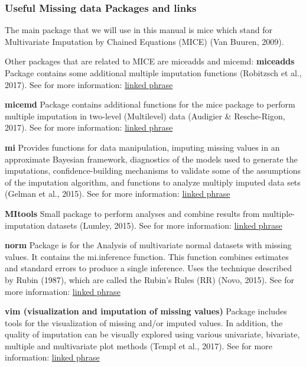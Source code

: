 \documentclass[]{book}
\theoremstyle{definition}
\theoremstyle{definition}
\theoremstyle{definition}
\theoremstyle{remark}
\begin{document}
\subsubsection{Useful Missing data Packages and
links}\label{useful-missing-data-packages-and-links}

The main package that we will use in this manual is mice which stand for
Multivariate Imputation by Chained Equations (MICE) (Van Buuren, 2009).

Other packages that are related to MICE are miceadds and micemd:
\textbf{miceadds} Package contains some additional multiple imputation
functions (Robitzsch et al., 2017). See for more information:
\href{https://cran.r-project.org/web/packages/miceadds/index.html}{linked
phrase}

\textbf{micemd} Package contains additional functions for the mice
package to perform multiple imputation in two-level (Multilevel) data
(Audigier \& Resche-Rigon, 2017). See for more information:
\href{https://cran.r-project.org/web/packages/micemd/index.html}{linked
phrase}

\textbf{mi} Provides functions for data manipulation, imputing missing
values in an approximate Bayesian framework, diagnostics of the models
used to generate the imputations, confidence-building mechanisms to
validate some of the assumptions of the imputation algorithm, and
functions to analyze multiply imputed data sets (Gelman et al., 2015).
See for more information:
\href{https://cran.r-project.org/web/packages/mi/index.html}{linked
phrase}

\textbf{MItools} Small package to perform analyses and combine results
from multiple-imputation datasets (Lumley, 2015). See for more
information:
\href{https://cran.r-project.org/web/packages/mitools/index.html}{linked
phrase}

\textbf{norm} Package is for the Analysis of multivariate normal
datasets with missing values. It contains the mi.inference function.
This function combines estimates and standard errors to produce a single
inference. Uses the technique described by Rubin (1987), which are
called the Rubin's Rules (RR) (Novo, 2015). See for more information:
\href{https://cran.r-project.org/web/packages/norm/index.html}{linked
phrase}

\textbf{vim (visualization and imputation of missing values)} Package
includes tools for the visualization of missing and/or imputed values.
In addition, the quality of imputation can be visually explored using
various univariate, bivariate, multiple and multivariate plot methods
(Templ et al., 2017). See for more information:
\href{https://cran.r-project.org/web/packages/mi/index.html}{linked
phrase}
\end{document}

